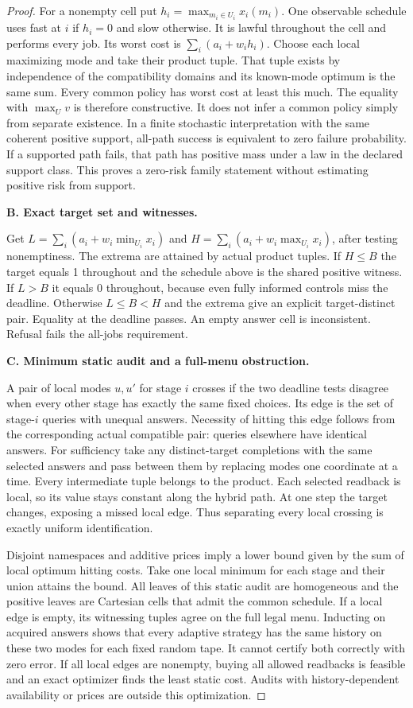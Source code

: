 \begin{proof}
For a nonempty cell put \(h_i=\max_{m_i\in U_i}x_i(m_i)\). One observable schedule uses fast at \(i\) if \(h_i=0\) and slow otherwise. It is lawful throughout the cell and performs every job. Its worst cost is \(\sum_i(a_i+w_i h_i)\). Choose each local maximizing mode and take their product tuple. That tuple exists by independence of the compatibility domains and its known-mode optimum is the same sum. Every common policy has worst cost at least this much. The equality with \(\max_U v\) is therefore constructive. It does not infer a common policy simply from separate existence. In a finite stochastic interpretation with the same coherent positive support, all-path success is equivalent to zero failure probability. If a supported path fails, that path has positive mass under a law in the declared support class. This proves a zero-risk family statement without estimating positive risk from support.

\textbf{B. Exact target set and witnesses.}

Get \(L=\sum_i(a_i+w_i\min_{U_i}x_i)\) and \(H=\sum_i(a_i+w_i\max_{U_i}x_i)\), after testing nonemptiness. The extrema are attained by actual product tuples. If \(H\le B\) the target equals 1 throughout and the schedule above is the shared positive witness. If \(L>B\) it equals 0 throughout, because even fully informed controls miss the deadline. Otherwise \(L\le B<H\) and the extrema give an explicit target-distinct pair. Equality at the deadline passes. An empty answer cell is inconsistent. Refusal fails the all-jobs requirement.

\textbf{C. Minimum static audit and a full-menu obstruction.}

A pair of local modes \(u,u'\) for stage \(i\) crosses if the two deadline tests disagree when every other stage has exactly the same fixed choices. Its edge is the set of stage-\(i\) queries with unequal answers. Necessity of hitting this edge follows from the corresponding actual compatible pair: queries elsewhere have identical answers. For sufficiency take any distinct-target completions with the same selected answers and pass between them by replacing modes one coordinate at a time. Every intermediate tuple belongs to the product. Each selected readback is local, so its value stays constant along the hybrid path. At one step the target changes, exposing a missed local edge. Thus separating every local crossing is exactly uniform identification.

Disjoint namespaces and additive prices imply a lower bound given by the sum of local optimum hitting costs. Take one local minimum for each stage and their union attains the bound. All leaves of this static audit are homogeneous and the positive leaves are Cartesian cells that admit the common schedule. If a local edge is empty, its witnessing tuples agree on the full legal menu. Inducting on acquired answers shows that every adaptive strategy has the same history on these two modes for each fixed random tape. It cannot certify both correctly with zero error. If all local edges are nonempty, buying all allowed readbacks is feasible and an exact optimizer finds the least static cost. Audits with history-dependent availability or prices are outside this optimization.


\end{proof}
